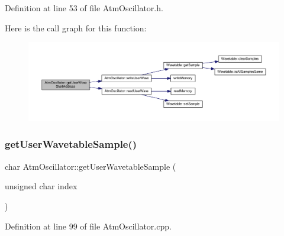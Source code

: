 Definition at line 53 of file Atm\+Oscillator.\+h.

Here is the call graph for this function\+:
\nopagebreak
\begin{figure}[H]
\begin{center}
\leavevmode
\includegraphics[width=350pt]{d8/d5f/class_atm_oscillator_a19bdaa400d57eeb24ca027febc2fd1cf_cgraph}
\end{center}
\end{figure}
\mbox{\label{class_atm_oscillator_ae5ef1556ef77dbf9ecceb5b64a1ad7e8}} 
\subsubsection{\texorpdfstring{get\+User\+Wavetable\+Sample()}{getUserWavetableSample()}}
{\footnotesize\ttfamily char Atm\+Oscillator\+::get\+User\+Wavetable\+Sample (\begin{DoxyParamCaption}\item[{unsigned char}]{index }\end{DoxyParamCaption})}



Definition at line 99 of file Atm\+Oscillator.\+cpp.

